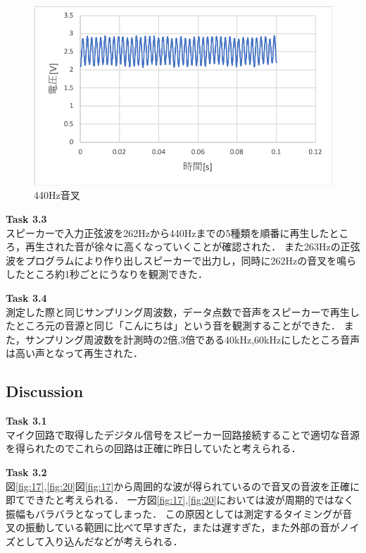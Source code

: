 \documentclass[11pt, a4paper,twocolumn]{jarticle}
\begin{document}
\begin{figure}[htbp]
 \begin{center}
  \includegraphics[width=0.8\linewidth]{fig21.png}
 \end{center}
 \caption{440Hz音叉}
 \label{fig:21}
\end{figure}

\noindent
\textbf{Task 3.3} \\
スピーカーで入力正弦波を262Hzから440Hzまでの5種類を順番に再生したところ，再生された音が徐々に高くなっていくことが確認された．
また263Hzの正弦波をプログラムにより作り出しスピーカーで出力し，同時に262Hzの音叉を鳴らしたところ約1秒ごとにうなりを観測できた．

\noindent
\textbf{Task 3.4} \\
測定した際と同じサンプリング周波数，データ点数で音声をスピーカーで再生したところ元の音源と同じ「こんにちは」という音を観測することができた．
また，サンプリング周波数を計測時の2倍,3倍である40kHz,60kHzにしたところ音声は高い声となって再生された．

\subsection{Discussion}
\noindent
\textbf{Task 3.1} \\
マイク回路で取得したデジタル信号をスピーカー回路接続することで適切な音源を得られたのでこれらの回路は正確に昨日していたと考えられる．

\noindent
\textbf{Task 3.2} \\
図\ref{fig:17},\ref{fig:20}図\ref{fig:17}から周囲的な波が得られているので音叉の音波を正確に即てできたと考えられる．
一方図\ref{fig:17},\ref{fig:20}においては波が周期的ではなく振幅もバラバラとなってしまった．
この原因としては測定するタイミングが音叉の振動している範囲に比べて早すぎた，または遅すぎた，また外部の音がノイズとして入り込んだなどが考えられる．
\end{document}
